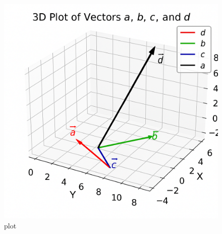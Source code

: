\documentclass{beamer}
\begin{document}
\begin{figure}
    \centering
    \includegraphics[width=0.5\linewidth]{figs/plot.png}
    \caption{plot}
    \label{fig:placeholder}
\end{figure}
\end{document}
